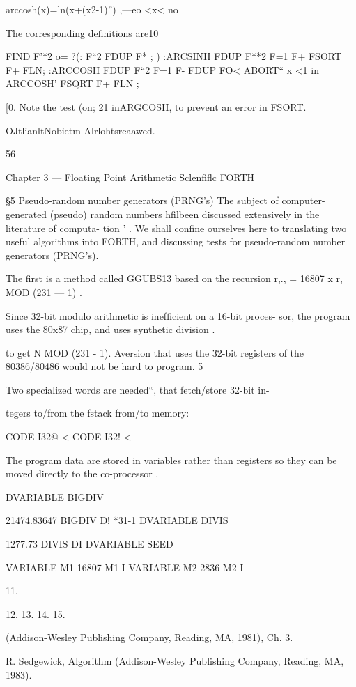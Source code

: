 arccosh(x)=ln(x+(x2-1)”) ,—eo <x< no

The corresponding deﬁnitions are10

FIND F'*2 o= ?(: F“2 FDUP F* ; )
:ARCSINH FDUP F**2 F=1 F+
FSORT F+ FLN;
:ARCCOSH FDUP F“2 F=1 F-
FDUP FO<
ABORT“ x <1 in ARCCOSH'
FSQRT F+ FLN ;

 

[0. Note the test (on; 21 inARGCOSH, to prevent an error in FSORT.

OJtlianltNobietm-Alrlohtsreaawed.

56

Chapter 3 — Floating Point Arithmetic Sclenﬁﬂc FORTH

§5 Pseudo-random number generators (PRNG's)
The subject of computer-generated (pseudo) random numbers
hﬁlbeen discussed extensively in the literature of computa-
tion ' . We shall conﬁne ourselves here to translating two useful
algorithms into FORTH, and discussing tests for pseudo-random
number generators (PRNG’s).

The ﬁrst is a method called GGUBS13 based on the recursion
r,., = 16807 x r, MOD (231 — 1) .

Since 32-bit modulo arithmetic is inefﬁcient on a 16-bit proces-
sor, the program uses the 80x87 chip, and uses synthetic division .

to get N MOD (231 - 1). Aversion that uses the 32-bit registers
of the 80386/80486 would not be hard to program. 5

 

Two specialized words are needed“, that fetch/store 32-bit in-

tegers to/from the fstack from/to memory:

CODE I32@ <%
CODE I32! < %

The program data are stored in variables rather than registers so
they can be moved directly to the co-processor .

DVARIABLE BIGDIV

21474.83647 BIGDIV D! \2**31-1
DVARIABLE DIVIS

1277.73 DIVIS DI
DVARIABLE SEED

VARIABLE M1 16807 M1 I
VARIABLE M2 2836 M2 I

 

11.

12.
13.
14.
15.

(Addison-Wesley Publishing Company, Reading, MA, 1981), Ch. 3.

R. Sedgewick, Algorithm (Addison-Wesley Publishing Company, Reading, MA, 1983).

